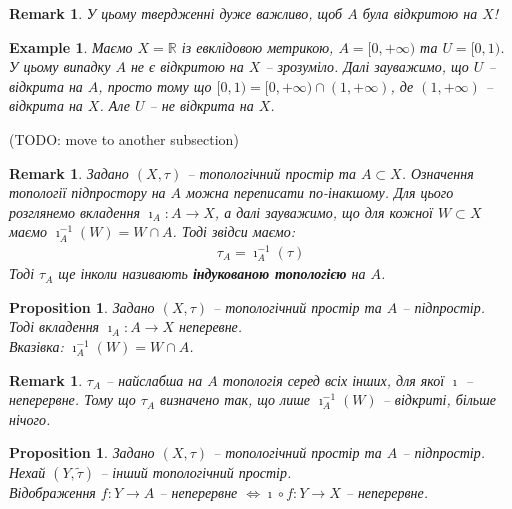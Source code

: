 \documentclass[a4paper, 10pt]{article}
\theoremstyle{theoremdd}
\newtheorem{example}[theorem]{Example}
\newtheorem{proposition}[theorem]{Proposition}
\newtheorem{remark}[theorem]{Remark}
\begin{document}
\begin{remark}
У цьому твердженні дуже важливо, щоб $A$ була відкритою на $X$!
\end{remark}

\begin{example}
Маємо $X = \mathbb{R}$ із евклідовою метрикою, $A = [0,+\infty)$ та $U = [0,1)$.\\
У цьому випадку $A$ не є відкритою на $X$ -- зрозуміло. Далі зауважимо, що $U$ -- відкрита на $A$, просто тому що $[0,1) = [0,+\infty) \cap (1,+\infty)$, де $(1,+\infty)$ -- відкрита на $X$. Але $U$ -- не відкрита на $X$.
\end{example}

(TODO: move to another subsection)

\begin{remark}
Задано $(X,\tau)$ -- топологічний простір та $A \subset X$. Означення топології підпростору на $A$ можна переписати по-інакшому. Для цього розглянемо вкладення $\imath_A \colon A \to X$, а далі зауважимо, що для кожної $W \subset X$ маємо $\imath_A^{-1}(W) = W \cap A$. Тоді звідси маємо:
\begin{align*}
\tau_A = \imath^{-1}_A(\tau)
\end{align*}
Тоді $\tau_A$ ще інколи називають \textbf{індукованою топологією} на $A$.
\end{remark}

\begin{proposition}
Задано $(X,\tau)$ -- топологічний простір та $A$ -- підпростір. Тоді вкладення $\imath_A \colon A \to X$ неперевне.\\
\textit{Вказівка: $\imath_A^{-1}(W) = W \cap A$.}
\end{proposition}

\begin{remark}
$\tau_A$ -- найслабша на $A$ топологія серед всіх інших, для якої $\imath$ -- неперервне. Тому що $\tau_A$ визначено так, що лише $\imath_A^{-1}(W)$ -- відкриті, більше нічого.
\end{remark}

\begin{proposition}
\label{continuity_on_smaller_codomain_iff_continuity_on_bigger_codomain}
Задано $(X,\tau)$ -- топологічний простір та $A$ -- підпростір. Нехай $(Y,\tilde{\tau})$ -- інший топологічний простір.\\
Відображення $f \colon Y \to A$ -- неперервне $\iff \imath \circ f \colon Y \to X$ -- неперервне.
\begin{figure}[H]
\centering
{}
\end{figure}
\end{proposition}
\end{document}
